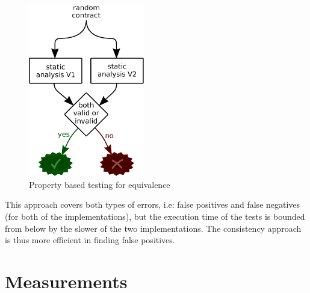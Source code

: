 \documentclass[english,runningheads]{llncs}
\begin{document}
\begin{figure}
\begin{centering}
\includegraphics[width=0.45\textwidth]{figures/equivalence_property}
\par\end{centering}
\caption{Property based testing for equivalence\label{fig:Property-based-testing-for-equivalence}}
\end{figure}

This approach covers both types of errors, i.e: false positives and
false negatives (for both of the implementations), but the execution
time of the tests is bounded from below by the slower of the two implementations.
The consistency approach is thus more efficient in finding false positives.

\section{Measurements}
\end{document}
